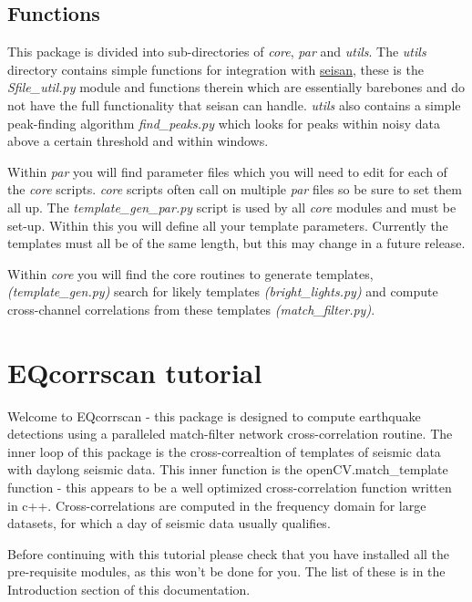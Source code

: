 \documentclass[a4paper,10pt,english]{sphinxmanual}
\begin{document}
\subsection{Functions}
\label{intro:functions}
This package is divided into sub-directories of \emph{core}, \emph{par} and \emph{utils}.  The
\emph{utils} directory contains simple functions for integration with
\href{http://seisan.info/}{seisan}, these is the \emph{Sfile\_util.py}
module and functions therein which are essentially barebones and do not have the
full functionality that seisan can handle.  \emph{utils} also contains a simple
peak-finding algorithm \emph{find\_peaks.py} which looks for peaks within noisy data
above a certain threshold and within windows.

Within \emph{par} you will find parameter files which you will need to edit for
each of the \emph{core} scripts.  \emph{core} scripts often call on multiple \emph{par} files
so be sure to set them all up.  The \emph{template\_gen\_par.py} script is used by all
\emph{core} modules and must be set-up.  Within this you will define all your
template parameters.  Currently the templates must all be of the same length,
but this may change in a future release.

Within \emph{core} you will find the core routines to generate templates,
\emph{(template\_gen.py)} search for likely templates \emph{(bright\_lights.py)} and
compute cross-channel correlations from these templates \emph{(match\_filter.py)}.


\section{EQcorrscan tutorial}
\label{tutorial:eqcorrscan-tutorial}\label{tutorial::doc}
Welcome to EQcorrscan - this package is designed to compute earthquake detections
using a paralleled match-filter network cross-correlation routine.  The inner
loop of this package is the cross-correaltion of templates of seismic data
with daylong seismic data.  This inner function is the openCV.match\_template
function - this appears to be a well optimized cross-correlation function written
in c++.  Cross-correlations are computed in the frequency domain for large
datasets, for which a day of seismic data usually qualifies.

Before continuing with this tutorial please check that you have installed all
the pre-requisite modules, as this won't be done for you.  The list of these is
in the Introduction section of this documentation.
\end{document}
